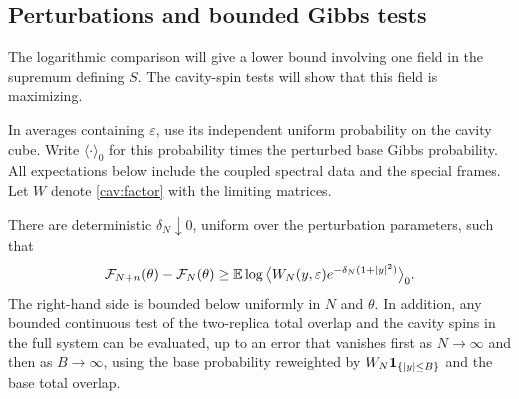 \subsection{Perturbations and bounded Gibbs tests}

The logarithmic comparison will give a lower bound involving one field
in the supremum defining $S$.  The cavity-spin tests will show that this
field is maximizing.

In averages containing $\varepsilon$, use its independent uniform
probability on the cavity cube.  Write $\langle\cdot\rangle_0$ for
this probability times the perturbed base Gibbs probability.  All
expectations below include the coupled spectral data and the special
frames.  Let $W$ denote \eqref{cav:factor} with the limiting matrices.

\begin{lemma}\label{cav:comparison}
There are deterministic $\delta_N\downarrow0$, uniform over the
perturbation parameters, such that
\begin{equation}\label{cav:increment-comparison}
 \mathcal F_{N+n}(\theta)-\mathcal F_N(\theta)
 \ge
 \mathbb E\log\big\langle
 W_N(y,\varepsilon)e^{-\delta_N(1+|y|^2)}
 \big\rangle_0.
\end{equation}
The right-hand side is bounded below uniformly in $N$ and $\theta$.
In addition, any bounded continuous test of the two-replica total
overlap and the cavity spins in the full system can be evaluated,
up to an error that vanishes first as $N\to\infty$ and then as
$B\to\infty$, using the base probability reweighted by
$W_N\mathbf 1_{\{|y|\le B\}}$ and the base total overlap.
\end{lemma}

